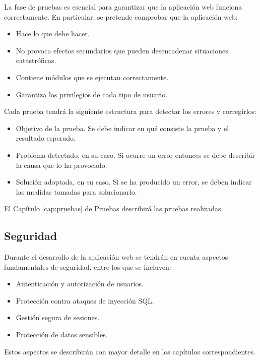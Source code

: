 La fase de pruebas es esencial para garantizar que la aplicación web funciona correctamente. En particular, se pretende comprobar que la aplicación web:
\begin{itemize}
    \item Hace lo que debe hacer.
    \item No provoca efectos secundarios que pueden desencadenar situaciones catastróficas.
    \item Contiene módulos que se ejecutan correctamente.
    \item Garantiza los privilegios de cada tipo de usuario.
\end{itemize}

Cada prueba tendrá la siguiente estructura para detectar los errores y corregirlos:
\begin{itemize}
    \item Objetivo de la prueba. Se debe indicar en qué consiste la prueba y el resultado esperado.
    \item Problema detectado, en su caso. Si ocurre un error entonces se debe describir la causa que lo ha provocado.
    \item Solución adoptada, en su caso. Si se ha producido un error, se deben indicar las medidas tomadas para solucionarlo.
\end{itemize}

El Capítulo \ref{cap:pruebas} de Pruebas describirá las pruebas realizadas.

\subsection{Seguridad}

    Durante el desarrollo de la aplicación web se tendrán en cuenta aspectos fundamentales de
    seguridad, entre los que se incluyen:

    \begin{itemize}
    \item Autenticación y autorización de usuarios.
    \item Protección contra ataques de inyección SQL.
    \item Gestión segura de sesiones.
    \item Protección de datos sensibles.
    \end{itemize}

Estos aspectos se describirán con mayor detalle en los capítulos correspondientes.
